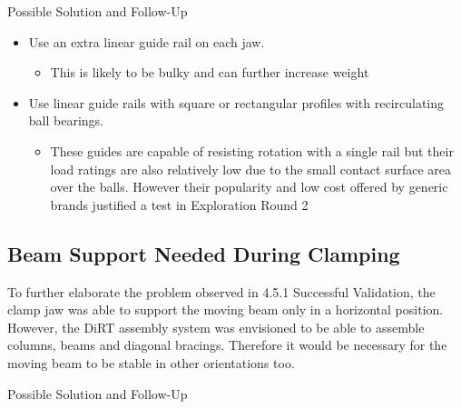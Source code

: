 Possible Solution and Follow-Up
\begin{itemize}
    \item Use an extra linear guide rail on each jaw.
    \begin{itemize}
        \item This is likely to be bulky and can further increase weight
    \end{itemize}
    \item Use linear guide rails with square or rectangular profiles with recirculating ball bearings.
    \begin{itemize}
        \item These guides are capable of resisting rotation with a single rail but their load ratings are also relatively low due to the small contact surface area over the balls. However their popularity and low cost offered by generic brands justified a test in Exploration Round 2 
    \end{itemize}
\end{itemize}
        
\subsection{Beam Support Needed During Clamping}
\label{subsection:exploration-1-beam-support-needed-during-clamping}

To further elaborate the problem observed in 4.5.1 Successful Validation, the clamp jaw was able to support the moving beam only in a horizontal position. However, the DiRT assembly system was envisioned to be able to assemble columns, beams and diagonal bracings. Therefore it would be necessary for the moving beam to be stable in other orientations too.

Possible Solution and Follow-Up

